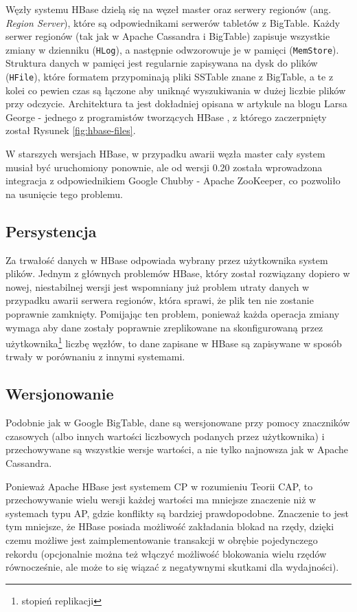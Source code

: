 Węzły systemu HBase dzielą się na węzeł master oraz serwery regionów (ang. \emph{Region Server}), które są odpowiednikami serwerów tabletów z BigTable.
Każdy serwer regionów (tak jak w Apache Cassandra i BigTable) zapisuje wszystkie zmiany w dzienniku (\verb+HLog+), a następnie odwzorowuje je w pamięci (\verb+MemStore+).
Struktura danych w pamięci jest regularnie zapisywana na dysk do plików (\verb+HFile+), które formatem przypominają pliki SSTable znane z BigTable, a te z kolei co pewien czas są łączone aby uniknąć wyszukiwania w dużej liczbie plików przy odczycie.
Architektura ta jest dokładniej opisana w artykule na blogu Larsa George - jednego z programistów tworzących HBase \cite{george-hbase-storage}, z którego zaczerpnięty został Rysunek \ref{fig:hbase-files}. 


W starszych wersjach HBase, w przypadku awarii węzła master cały system musiał być uruchomiony ponownie, ale od wersji 0.20 została wprowadzona integracja z odpowiednikiem Google Chubby - Apache ZooKeeper, co pozwoliło na usunięcie tego problemu.

\subsection*{Persystencja}

Za trwałość danych w HBase odpowiada wybrany przez użytkownika system plików.
Jednym z głównych problemów HBase, który został rozwiązany dopiero w nowej, niestabilnej wersji jest wspomniany już problem utraty danych w przypadku awarii serwera regionów, która sprawi, że plik ten nie zostanie poprawnie zamknięty.
Pomijając ten problem, ponieważ każda operacja zmiany wymaga aby dane zostały poprawnie zreplikowane na skonfigurowaną przez użytkownika\footnote{stopień replikacji} liczbę węzłów, to dane zapisane w HBase są zapisywane w sposób trwały w porównaniu z innymi systemami.

\subsection*{Wersjonowanie}

Podobnie jak w Google BigTable, dane są wersjonowane przy pomocy znaczników czasowych (albo innych wartości liczbowych podanych przez użytkownika) i przechowywane są wszystkie wersje wartości, a nie tylko najnowsza jak w Apache Cassandra.

Ponieważ Apache HBase jest systemem CP w rozumieniu Teorii CAP, to przechowywanie wielu wersji każdej wartości ma mniejsze znaczenie niż w systemach typu AP, gdzie konflikty są bardziej prawdopodobne.
Znaczenie to jest tym mniejsze, że HBase posiada możliwość zakładania blokad na rzędy, dzięki czemu możliwe jest zaimplementowanie transakcji w obrębie pojedynczego rekordu (opcjonalnie można też włączyć możliwość blokowania wielu rzędów równocześnie, ale może to się wiązać z negatywnymi skutkami dla wydajności).

